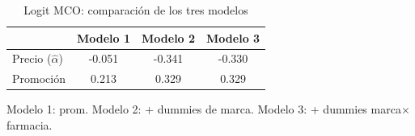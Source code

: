 \begin{table}[H]
\centering
\caption{Logit MCO: comparaci\'on de los tres modelos}
\begin{tabular}{lccc}
\toprule
 & Modelo 1 & Modelo 2 & Modelo 3 \\
\midrule
Precio ($\hat{\alpha}$) & -0.051 & -0.341 & -0.330 \\
Promoci\'on & 0.213 & 0.329 & 0.329 \\
\bottomrule
\end{tabular}

\smallskip
{\footnotesize\begin{minipage}{0.92\linewidth}Modelo 1: prom. Modelo 2: + dummies de marca. Modelo 3: + dummies marca$\times$farmacia.\end{minipage}}
\end{table}
